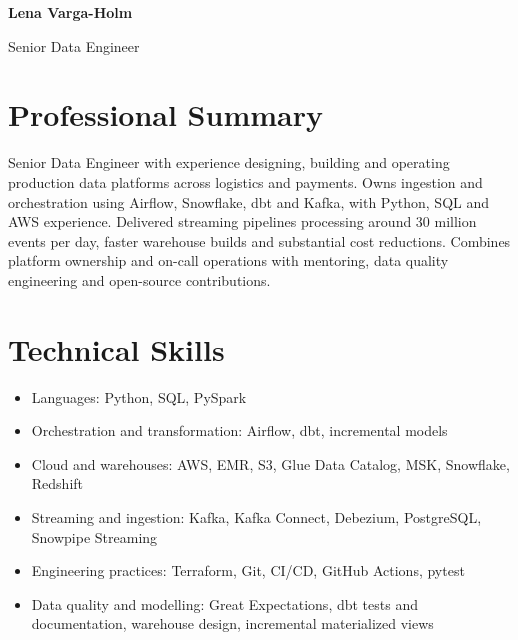\documentclass[11pt,a4paper]{article}
\newcommand{\cvsection}[1]{\section*{#1}}
\begin{document}
{\Huge\bfseries\color{primarycolor} Lena Varga-Holm}\par
{\large\color{accentcolor} Senior Data Engineer}\par

\cvsection{Professional Summary}
Senior Data Engineer with experience designing, building and operating production data platforms across logistics and payments. Owns ingestion and orchestration using Airflow, Snowflake, dbt and Kafka, with Python, SQL and AWS experience. Delivered streaming pipelines processing around 30 million events per day, faster warehouse builds and substantial cost reductions. Combines platform ownership and on-call operations with mentoring, data quality engineering and open-source contributions.

\cvsection{Technical Skills}
\begin{itemize}
\item Languages: Python, SQL, PySpark
\item Orchestration and transformation: Airflow, dbt, incremental models
\item Cloud and warehouses: AWS, EMR, S3, Glue Data Catalog, MSK, Snowflake, Redshift
\item Streaming and ingestion: Kafka, Kafka Connect, Debezium, PostgreSQL, Snowpipe Streaming
\item Engineering practices: Terraform, Git, CI/CD, GitHub Actions, pytest
\item Data quality and modelling: Great Expectations, dbt tests and documentation, warehouse design, incremental materialized views
\end{itemize}
\end{document}

